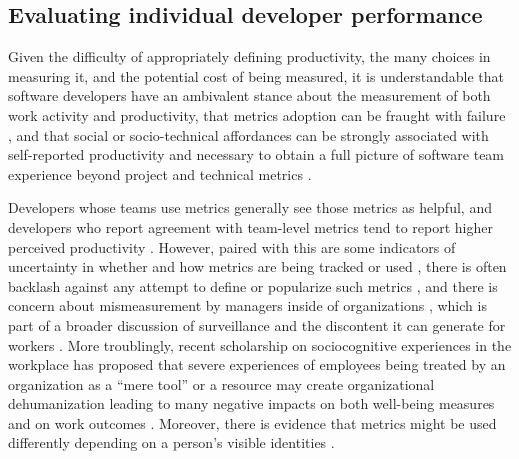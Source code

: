 \documentclass[manuscript,screen,review]{acmart}
\begin{document}
\subsection{Evaluating individual developer
performance}\label{evaluating-individual-developer-performance}

Given the difficulty of appropriately defining productivity, the many
choices in measuring it, and the potential cost of being measured, it is
understandable that software developers have an ambivalent stance about
the measurement of both work activity and productivity, that metrics
adoption can be fraught with failure
\citep{bouwersSoftwareMetricsPitfalls2013}, and that social or
socio-technical affordances can be strongly associated with
self-reported productivity and necessary to obtain a full picture of
software team experience beyond project and technical metrics
\citep{hicksDeveloperThrivingFour2023, murphy-hillWhatPredictsSoftware2021}.

Developers whose teams use metrics generally see those metrics as
helpful, and developers who report agreement with team-level metrics
tend to report higher perceived productivity
\citep{hicksDeveloperThrivingFour2023, hicksDeveloperThrivingFour2024}.
However, paired with this are some indicators of uncertainty in whether
and how metrics are being tracked or used
\citep{hicksDeveloperThrivingFour2023}, there is often backlash against
any attempt to define or popularize such metrics
\citep{bruneauxWhatMcKinseyHas2024, chhunejaWhy50Developers2024, coteOnlyPeopleWho2023, finster5MinuteDevOps2023, oroszMeasuringDeveloperProductivity2024, oroszMeasuringDeveloperProductivity2024a, rigginsWhatMcKinseyGot2023, terhorst-northMcKinseyDeveloperProductivity2023, terhorst-northWorstProgrammerKnow2023, walkerConsUsingSPACE2023, walkerEverythingWrongDORA2023},
and there is concern about mismeasurement by managers inside of
organizations \citep{hicksDeveloperThrivingFour2023}, which is part of a
broader discussion of surveillance and the discontent it can generate
for workers
\citep{ballWorkplaceSurveillanceOverview2010, grisoldDigitalSurveillanceOrganizations2024, mettlerConnectedWorkplaceCharacteristics2024}.
More troublingly, recent scholarship on sociocognitive experiences in
the workplace has proposed that severe experiences of employees being
treated by an organization as a ``mere tool'' or a resource may create
organizational dehumanization leading to many negative impacts on both
well-being measures and on work outcomes
\citep{caesensPerceivedOrganizationalSupport2017, lagiosExplainingNegativeConsequences2022}.
Moreover, there is evidence that metrics might be used differently
depending on a person's visible identities
\citep[e.g,][]{quadlinMarkWomansRecord2018}.
\end{document}
